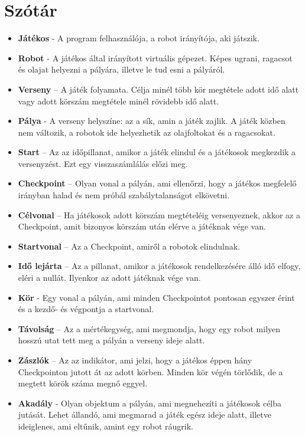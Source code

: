 \section{Szótár}
\begin{itemize}
\item \textbf{Játékos} - A program felhasználója, a robot irányítója, aki játszik.
\item \textbf{Robot} - A játékos által irányított virtuális gépezet. Képes ugrani, ragacsot és olajat helyezni a pályára, illetve le tud esni a pályáról.
\item \textbf{Verseny} – A játék folyamata. Célja minél több kör megtétele adott idő alatt vagy adott körszám megtétele minél rövidebb idő alatt.
\item \textbf{Pálya} - A verseny helyszíne: az a sík, amin a játék zajlik. A játék közben nem változik, a robotok ide helyezhetik az olajfoltokat és a ragacsokat.
\item \textbf{Start} – Az az időpillanat, amikor a játék elindul és a játékosok megkezdik a versenyzést. Ezt egy visszaszámlálás előzi meg.
\item \textbf{Checkpoint} – Olyan vonal a pályán, ami ellenőrzi, hogy a játékos megfelelő irányban halad és nem próbál szabálytalanságot elkövetni.
\item \textbf{Célvonal} – Ha játékosok adott körszám megtételéig versenyeznek, akkor az a Checkpoint, amit bizonyos körszám után elérve a játéknak vége van.
\item \textbf{Startvonal} – Az a Checkpoint, amiről a robotok elindulnak.
\item \textbf{Idő lejárta} – Az a pillanat, amikor a játékosok rendelkezésére álló idő elfogy, eléri a nullát. Ilyenkor az adott játéknak vége van.
\item \textbf{Kör} - Egy vonal a pályán, ami minden Checkpointot pontosan egyszer érint és a kezdő- és végpontja a startvonal.
\item \textbf{Távolság} – Az a mértékegység, ami megmondja, hogy egy robot milyen hosszú utat tett meg a pályán a verseny ideje alatt.
\item \textbf{Zászlók} – Az az indikátor, ami jelzi, hogy a játékos éppen hány Checkpointon jutott át az adott körben. Minden kör végén törlődik, de a megtett körök száma megnő eggyel.
\item \textbf{Akadály} - Olyan objektum a pályán, ami megnehezíti a játékosok célba jutását. Lehet állandó, ami megmarad a játék egész ideje alatt, illetve ideiglenes, ami eltűnik, amint egy robot ráugrik.

\end{itemize}
